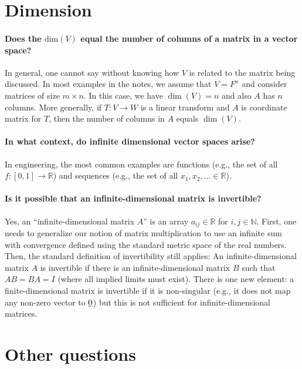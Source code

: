 \documentclass[10pt,english]{article}
\begin{document}
\section{Dimension}

\paragraph{Does the $\mathrm{dim}(V)$ equal the number of columns of a matrix in a vector space?}
In general, one cannot say without knowing how $V$ is related to the matrix being discussed.
In most examples in the notes, we assume that $V=F^n$ and consider matrices of size $m \times n$.
In this case, we have $\dim(V)=n$ and also $A$ has $n$ columns.
More generally, if $T\colon V \to W$ is a linear transform and $A$ is coordinate matrix for $T$, then the number of columns in $A$ equals $\dim(V)$.


\paragraph{In what context, do infinite dimensional vector spaces arise?}

In engineering, the most common examples are functions (e.g., the set of all $f\colon [0,1] \to \mathbb{R}$) and sequences (e.g., the set of all $x_1,x_2,\ldots \in \mathbb{R}$).

\paragraph{Is it possible that an infinite-dimensional matrix is invertible?}

Yes, an ``infinite-dimensional matrix $A$'' is an array $a_{ij} \in \mathbb{R}$ for $i,j \in \mathbb{N}$.
First, one needs to generalize our notion of matrix multiplication to use an infinite sum with convergence defined using the standard metric space of the real numbers.
Then, the standard definition of invertibility still applies: An infinite-dimensional matrix $A$ is invertible if there is an infinite-dimensional matrix $B$ such that $AB = BA = I$ (where all implied limits must exist).
There is one new element: a finite-dimensional matrix is invertible if it is non-singular (e.g., it does not map any non-zero vector to $\underline{0}$) but this is not sufficient for infinite-dimensional matrices.


\section{Other questions}
\end{document}
